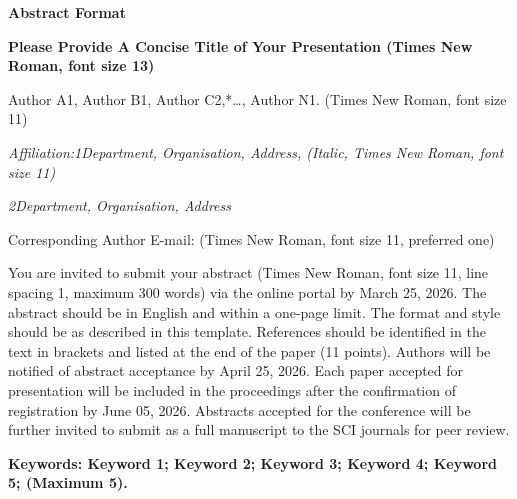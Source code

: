 \documentclass[11pt]{article}
\newcommand{\TitleFont}{\fontsize{13}{15}\selectfont\bfseries}
\newcommand{\BodyFont}{\fontsize{11}{13}\selectfont}
\newcommand{\AffilFont}{\fontsize{11}{13}\selectfont\itshape}
\newcommand{\SmallBold}{\fontsize{11}{13}\selectfont\bfseries}
\begin{document}
\begin{center}
{\TitleFont Abstract Format\par}
\vspace{8pt}

{\TitleFont Please Provide A Concise Title of Your Presentation (Times New Roman, font size 13)\par}
\vspace{10pt}

{\BodyFont Author A1, Author B1, Author C2,*\ldots, Author N1. (Times New Roman, font size 11)\par}
\vspace{6pt}

{\AffilFont \textcolor{wordred}{Affiliation:1Department, Organisation, Address, (Italic, Times New Roman, font size 11)}\par}
{\AffilFont \textcolor{wordred}{2Department, Organisation, Address}\par}
\vspace{6pt}

{\BodyFont *Corresponding Author E-mail: (Times New Roman, font size 11, preferred one)\par}
\end{center}

\vspace{8pt}

{\BodyFont
You are invited to submit your abstract (Times New Roman, font size 11, line spacing 1, maximum 300 words) via the online portal by March 25, 2026. The abstract should be in English and within a one-page limit. The format and style should be as described in this template. References should be identified in the text in brackets and listed at the end of the paper (11 points). Authors will be notified of abstract acceptance by April 25, 2026. Each paper accepted for presentation will be included in the proceedings after the confirmation of registration by June 05, 2026. Abstracts accepted for the conference will be further invited to submit as a full manuscript to the SCI journals for peer review. 
\par}

\vspace{8pt}

{\SmallBold \textcolor{wordred}{Keywords:} \BodyFont Keyword 1; Keyword 2; Keyword 3; Keyword 4; Keyword 5; (Maximum 5).\par}

\vspace{10pt}
\end{document}

